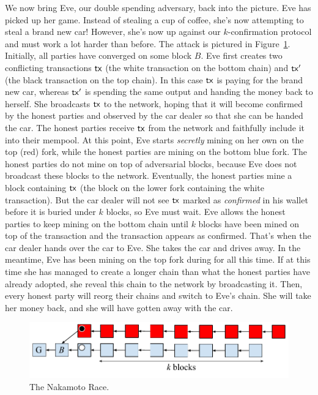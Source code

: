 We now bring Eve, our double spending adversary, back into the picture. Eve has picked up her game.
Instead of stealing a cup of coffee, she's now attempting to steal a brand new car!
However, she's now up against our $k$-confirmation protocol and must work a lot harder than before. The attack is
pictured in Figure~\ref{fig.nakamoto-race}. Initially, all parties have converged on some block $B$.
Eve first creates two conflicting transactions
$\mathsf{tx}$ (the white transaction on the bottom chain) and $\mathsf{tx}'$ (the black transaction on the top chain).
In this case $\mathsf{tx}$ is paying for the brand new car, whereas $\mathsf{tx}'$ is spending the same
output and handing the money back to herself. She broadcasts $\mathsf{tx}$ to the network, hoping that
it will become confirmed by the honest parties and observed by the car dealer so that she can be handed
the car. The honest parties receive $\mathsf{tx}$ from the network and faithfully include it into their mempool.
At this point, Eve starts \emph{secretly} mining on her own on the top (red) fork, while the honest
parties are mining on the bottom blue fork. The honest parties do not mine on top of adversarial blocks,
because Eve does not broadcast these blocks to the network.
Eventually, the honest parties mine a block containing $\mathsf{tx}$ (the block on the lower fork containing the
white transaction). But the car dealer will not see $\mathsf{tx}$ marked as \emph{confirmed} in his wallet before it is
buried under $k$ blocks, so Eve must wait. Eve allows the honest parties to keep mining on the
bottom chain until $k$ blocks have been mined on top of the transaction and the transaction appears
as confirmed. That's when the car dealer hands over the car to Eve. She takes the car and drives away.
In the meantime, Eve has been mining on the top fork during for all this time. If at this time she has
managed to create a longer chain than what the honest parties have already adopted, she reveal this
chain to the network by broadcasting it. Then, every honest party will reorg their chains and switch
to Eve's chain. She will take her money back, and she will have gotten away with the car.

\begin{figure}[h]
    \centering
    \includegraphics[width=0.7 \columnwidth,keepaspectratio]{figures/nakamoto-race.pdf}
    \caption{The Nakamoto Race.}
    \label{fig.nakamoto-race}
\end{figure}

